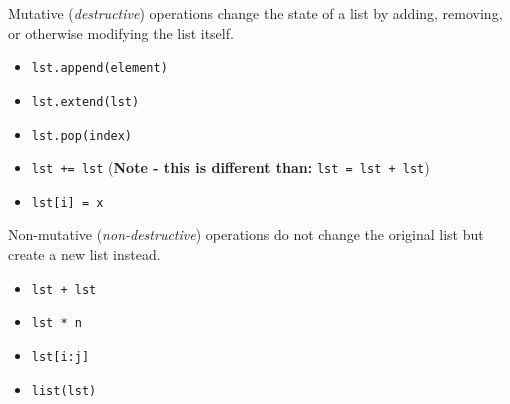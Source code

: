 \begin{blocksection}
Mutative (\emph{destructive}) operations change the state of a list by adding,
removing, or otherwise modifying the list itself.

\begin{itemize}
\item \lstinline$lst.append(element)$
\item \lstinline$lst.extend(lst)$
\item \lstinline$lst.pop(index)$
\item \lstinline$lst += lst$ (\textbf{Note - this is different than:} \lstinline$lst = lst + lst$)
\item \lstinline$lst[i] = x$
\end{itemize}
\end{blocksection}

\vspace{\parskip}

\begin{blocksection}
Non-mutative (\emph{non-destructive}) operations do not change the original list but create a new list instead.

\begin{itemize}
\item \lstinline$lst + lst$
\item \lstinline$lst * n$
\item \lstinline$lst[i:j]$
\item \lstinline$list(lst)$
\end{itemize}
\end{blocksection}

\vspace{\parskip}
